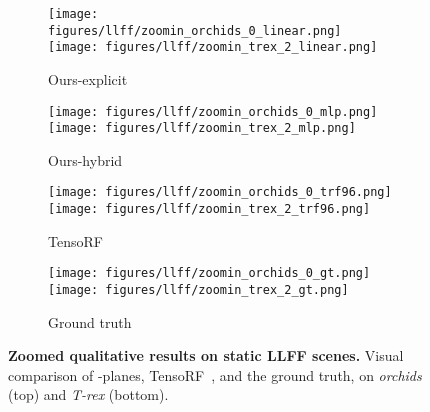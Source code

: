\documentclass[10pt,twocolumn,letterpaper]{article}
\newcommand{\modelname}{-planes}
\begin{document}
\begin{figure}[t]
  \centering
  \begin{subfigure}[b]{0.24\linewidth}
    \texttt{[image: figures/llff/zoomin\_orchids\_0\_linear.png]}
    \texttt{[image: figures/llff/zoomin\_trex\_2\_linear.png]}
    \caption{Ours-explicit}
  \end{subfigure}
  \begin{subfigure}[b]{0.24\linewidth}
    \texttt{[image: figures/llff/zoomin\_orchids\_0\_mlp.png]}
    \texttt{[image: figures/llff/zoomin\_trex\_2\_mlp.png]}
    \caption{Ours-hybrid}
  \end{subfigure}
  \begin{subfigure}[b]{0.24\linewidth}
    \texttt{[image: figures/llff/zoomin\_orchids\_0\_trf96.png]}
    \texttt{[image: figures/llff/zoomin\_trex\_2\_trf96.png]}
    \caption{TensoRF}
  \end{subfigure}
  \begin{subfigure}[b]{0.24\linewidth}
    \texttt{[image: figures/llff/zoomin\_orchids\_0\_gt.png]}
    \texttt{[image: figures/llff/zoomin\_trex\_2\_gt.png]}
    \caption{Ground truth}
  \end{subfigure}
  \caption{\textbf{Zoomed qualitative results on static LLFF scenes.} Visual comparison of \modelname{}, TensoRF~\cite{tensorf}, and the ground truth, on \emph{orchids} (top) and \emph{T-rex} (bottom).}
  \label{fig:llff-zoom}
\end{figure}
\end{document}
